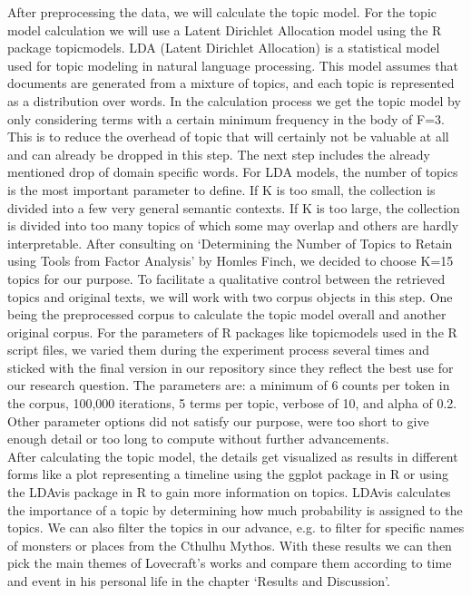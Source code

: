 After preprocessing the data, we will calculate the topic model. For the topic model 
calculation we will use a Latent Dirichlet Allocation model using the R package topicmodels. 
LDA (Latent Dirichlet Allocation) is a statistical model used for topic modeling in natural 
language processing. This model assumes that documents are generated from a mixture of topics, 
and each topic is represented as a distribution over words. In the calculation process we get 
the topic model by only considering terms with a certain minimum frequency in the body of F=3. 
This is to reduce the overhead of topic that will certainly not be valuable at all and can 
already be dropped in this step. The next step includes the already mentioned drop of domain 
specific words. For LDA models, the number of topics is the most important parameter to 
define. If K is too small, the collection is divided into a few very general semantic contexts. 
If K is too large, the collection is divided into too many topics of which some may overlap 
and others are hardly interpretable. After consulting on ‘Determining the Number of Topics 
to Retain using Tools from Factor Analysis’ by Homles Finch, we decided to choose K=15 topics 
for our purpose. To facilitate a qualitative control between the retrieved topics and original 
texts, we will work with two corpus objects in this step. One being the preprocessed corpus 
to calculate the topic model overall and another original corpus. For the parameters of R 
packages like topicmodels used in the R script files, we varied them during the experiment 
process several times and sticked with the final version in our repository since they reflect 
the best use for our research question. The parameters are: a minimum of 6 counts per token 
in the corpus, 100,000 iterations, 5 terms per topic, verbose of 10, and alpha of 0.2. Other 
parameter options did not satisfy our purpose, were too short to give enough detail or too 
long to compute without further advancements.\\

After calculating the topic model, the details get visualized as results in different forms 
like a plot representing a timeline using the ggplot package in R or using the LDAvis package 
in R to gain more information on topics. LDAvis calculates the importance of a topic by 
determining how much probability is assigned to the topics. We can also filter the topics 
in our advance, e.g. to filter for specific names of monsters or places from the Cthulhu 
Mythos. With these results we can then pick the main themes of Lovecraft’s works and compare 
them according to time and event in his personal life in the chapter ‘Results and Discussion’.\\
